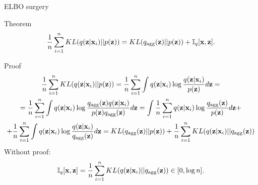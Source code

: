 \begin{frame}{ELBO surgery}
	\begin{block}{Theorem}
		\vspace{-0.3cm}
		\[
		    \frac{1}{n} \sum_{i=1}^n KL(q(\mathbf{z} | \mathbf{x}_i) || p(\mathbf{z})) = KL(q_{\text{agg}}(\mathbf{z}) || p(\mathbf{z})) + \mathbb{I}_q [\mathbf{x}, \mathbf{z}].
		\]
		\vspace{-0.4cm}
	\end{block}
	\begin{block}{Proof}
		\vspace{-0.5cm}
		{\footnotesize
		\begin{multline*}
		    \frac{1}{n} \sum_{i=1}^n KL(q(\mathbf{z} | \mathbf{x}_i) || p(\mathbf{z})) = \frac{1}{n} \sum_{i=1}^n \int q(\mathbf{z} | \mathbf{x}_i) \log \frac{q(\mathbf{z} | \mathbf{x}_i)}{p(\mathbf{z})} d \mathbf{z} = \\
		    = \frac{1}{n} \sum_{i=1}^n \int q(\mathbf{z} | \mathbf{x}_i) \log \frac{q_{\text{agg}}(\mathbf{z}) q(\mathbf{z} | \mathbf{x}_i)}{p(\mathbf{z})q_{\text{agg}}(\mathbf{z})} d \mathbf{z} 
		    = \int \frac{1}{n} \sum_{i=1}^n  q(\mathbf{z} | \mathbf{x}_i) \log \frac{q_{\text{agg}}(\mathbf{z})}{p(\mathbf{z})} d \mathbf{z} + \\ 
		    + \frac{1}{n}\sum_{i=1}^n \int q(\mathbf{z} | \mathbf{x}_i) \log \frac{q(\mathbf{z} | \mathbf{x}_i)}{q_{\text{agg}}(\mathbf{z})} d \mathbf{z} = 
		     KL (q_{\text{agg}}(\mathbf{z}) || p(\mathbf{z})) + \frac{1}{n}\sum_{i=1}^n KL(q(\mathbf{z} | \mathbf{x}_i) || q_{\text{agg}}(\mathbf{z}))
		\end{multline*}
		}
		Without proof:
		\vspace{-0.4cm}
		\[
			\mathbb{I}_{q} [\mathbf{x}, \mathbf{z}] = \frac{1}{n}\sum_{i=1}^n KL(q(\mathbf{z} | \mathbf{x}_i) || q_{\text{agg}}(\mathbf{z})) \in [0, \log n].
		\]
	\end{block}

\end{frame}
